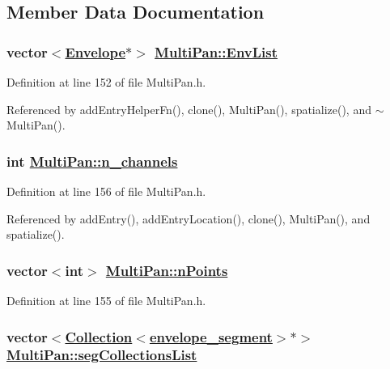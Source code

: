 \subsection{Member Data Documentation}
\hypertarget{classMultiPan_r1}{
\subsubsection[EnvList]{\setlength{\rightskip}{0pt plus 5cm}vector$<$\hyperlink{classEnvelope}{Envelope}$\ast$$>$ \hyperlink{classMultiPan_r1}{Multi\-Pan::Env\-List}}}
\label{classMultiPan_r1}




Definition at line 152 of file Multi\-Pan.h.

Referenced by add\-Entry\-Helper\-Fn(), clone(), Multi\-Pan(), spatialize(), and $\sim$Multi\-Pan().\hypertarget{classMultiPan_r5}{
\subsubsection[n\_\-channels]{\setlength{\rightskip}{0pt plus 5cm}int \hyperlink{classMultiPan_r5}{Multi\-Pan::n\_\-channels}}}
\label{classMultiPan_r5}




Definition at line 156 of file Multi\-Pan.h.

Referenced by add\-Entry(), add\-Entry\-Location(), clone(), Multi\-Pan(), and spatialize().\hypertarget{classMultiPan_r4}{
\subsubsection[nPoints]{\setlength{\rightskip}{0pt plus 5cm}vector$<$int$>$ \hyperlink{classMultiPan_r4}{Multi\-Pan::n\-Points}}}
\label{classMultiPan_r4}




Definition at line 155 of file Multi\-Pan.h.\hypertarget{classMultiPan_r3}{
\subsubsection[segCollectionsList]{\setlength{\rightskip}{0pt plus 5cm}vector$<$\hyperlink{classCollection}{Collection}$<$\hyperlink{structenvelope__segment}{envelope\_\-segment}$>$$\ast$$>$ \hyperlink{classMultiPan_r3}{Multi\-Pan::seg\-Collections\-List}}}
\label{classMultiPan_r3}




